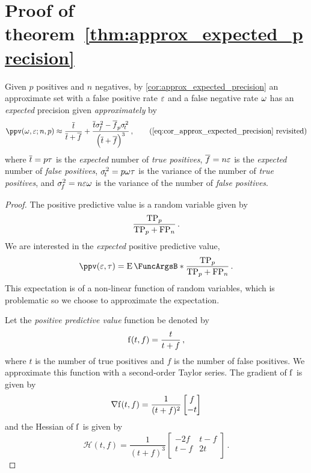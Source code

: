 \documentclass[10pt,final,hidelinks]{article}
\numberwithin{equation}{section}
\begin{document}
{\section{Proof of theorem~\ref{thm:approx_expected_precision}}
\label{sec:proof_approx_expected_precision}
Given $p$ positives and $n$ negatives, by \cref{cor:approx_expected_precision} an approximate set with a false positive rate $\varepsilon$ and a false negative rate $\omega$ has an \emph{expected} precision given \emph{approximately} by
\begin{equation*}
    \ppv(\fnrate, \fprate ; n, p) \approx \frac{\overline{t}}{\overline{t} + \overline{f}} +
    \frac{\overline{t} \sigma_{\!f}^2 - \overline{f}_p \sigma_{\!t}^2}{\left(\overline{t} + \overline{f}\right)^3}\,,
    \tag{\ref{eq:cor_approx_expected_precision} revisited}
\end{equation*}
where $\overline{t} = p \tau$ is the \emph{expected} number of \emph{true positives}, $\overline{f} =  n \varepsilon$ is the \emph{expected} number of \emph{false positives}, $\sigma_{\!t}^2 = p \omega \tau$ is the variance of the number of \emph{true positives}, and $\sigma_{\!f}^2 = n \varepsilon \omega$ is the variance of the number of \emph{false positives}.
\begin{proof}
The positive predictive value is a random variable given by
\begin{equation}
    \frac{\mathrm{TP}_p}{\mathrm{TP}_p + \mathrm{FP}_n}\,.
\end{equation}
We are interested in the \emph{expected} positive predictive value,
\begin{equation}
    \ppv(\fprate,\tprate) = \Expect{\frac{\TP_p}{\TP_p + \FP_n}}\,.
\end{equation}
This expectation is of a non-linear function of random variables, which is problematic so we choose to approximate the expectation.

Let the \emph{positive predictive value} function be denoted by
\begin{equation}
    \Fun{f}(t, f) = \frac{t}{t + f}\,,
\end{equation}
where $t$ is the number of true positives and $f$ is the number of false positives.
We approximate this function with a second-order Taylor series.
The gradient of $\Fun{f}$ is given by
\begin{equation}
    \nabla{\Fun{f}}(t,f) =
    \frac{1}{(t + f)^2}
    \begin{bmatrix}
        f\\
        -t\\
    \end{bmatrix}
\end{equation}
and the Hessian of $\Fun{f}$ is given by
\begin{equation}
    \mathcal{H}(t,f) =
    \frac{1}{(t + f)^3}
    \begin{bmatrix}
        -2 f & t-f\\
        t-f & 2 t \\
    \end{bmatrix}\,.
\end{equation}


\end{proof}}
\end{document}
